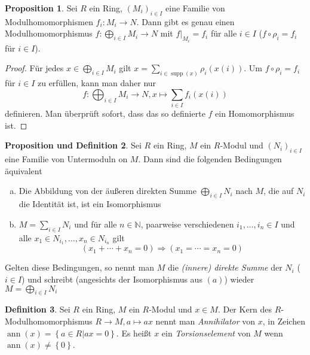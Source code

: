 \documentclass[
twoside=semi,
fontsize=12,
DIV=12, 
cleardoublepage=current,
leqno,
headings=optiontoheadandtoc, 
toc=idx
]{scrbook}
\newcommand{\N}{\mathbb{N}}
\newcommand{\set}[1]{\left\{ #1 \right\}}
\DeclareMathOperator{\supp}{supp}
\DeclareMathOperator{\ann}{ann}
\theoremstyle{definition}
\newtheorem{definition}{Definition}[section]
\newtheorem{proposition}[definition]{Proposition}
\newtheorem{prop-def}[definition]{Proposition und Definition}
\begin{document}
	\begin{proposition}\label{1.2.2}
		Sei $R$ ein Ring, $(M_i)_{i \in I}$ eine Familie von Modulhomomorphismen $f_i: M_i \to N$. Dann gibt es genau einen Modulhomomorphismus $f:\bigoplus_{i \in I} M_i \to N$ mit $f\big|_{M_i} = f_i$ f\"ur alle $i \in I$ ($f \circ \rho_i = f_i$ f\"ur $i \in I$).
	\end{proposition}
	\begin{proof}
		F\"ur jedes $x \in \bigoplus_{i \in I} M_i$ gilt $x = \sum_{i \in \supp(x)} \rho_i (x(i))$. Um $f \circ \rho_i = f_i$ f\"ur $i \in I$ zu erf\"ullen, kann man daher nur 
		\[f: \bigoplus_{i \in I} M_i \to N, x \mapsto \sum_{i \in I} f_i(x(i))\] 
		definieren. Man \"uberpr\"uft sofort, dass das so definierte $f$ ein Homomorphismus ist.
	\end{proof}
	
	\begin{prop-def}\label{1.2.3}
		Sei $R$ ein Ring, $M$ ein $R$-Modul und $(N_i)_{i \in I}$ eine Familie von Untermoduln on $M$. Dann sind die folgenden Bedingungen \"aquivalent
		\begin{enumerate}[(a)]
			\item Die Abbildung von der \"au\ss eren direkten Summe $\bigoplus_{i \in I} N_i$ nach $M$, die auf $N_i$ die Identit\"at ist, ist ein Isomorphismus
			\item $M = \sum_{i \in I} N_i$ und f\"ur alle $n \in \N$, paarweise verschiedenen $i_1, \dots, i_n \in I$ und alle $x_1 \in N_{i_1}, \dots, x_n \in N_{i_n}$ gilt 
				\[(x_1 + \cdots + x_n = 0) \Rightarrow (x_1 = \cdots = x_n = 0)\]  
		\end{enumerate}
	Gelten diese Bedingungen, so nennt man $M$ die \emph{(innere) direkte Summe} der $N_i$ ($i \in I$) und schreibt (angesichts der Isomorphismus aus $(a)$) wieder $M = \bigoplus_{i \in I} N_i$
	\end{prop-def}

	\begin{definition}\label{1.2.4}
		Sei $R$ ein Ring, $M$ ein $R$-Modul und $x \in M$. Der Kern des $R$-Modulhomomorphismus $R \to M, a \mapsto ax$ nennt man \emph{Annihilator} von $x$, in Zeichen $\ann(x) = \set{a \in R| ax = 0}$.\newline
		Es hei\ss t $x$ ein \emph{Torsionselement} von $M$ wenn $\ann(x) \neq \set{0}$.
	\end{definition}
\end{document}

